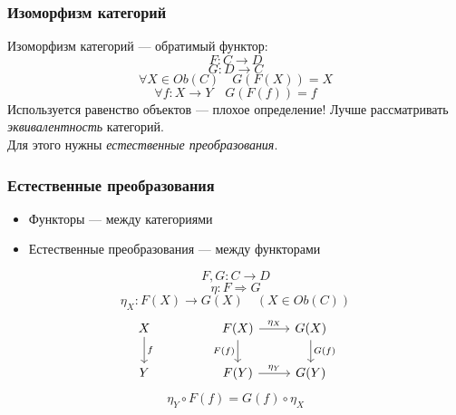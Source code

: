 \documentclass{beamer}
\begin{document}
\begin{frame}
\frametitle{Изоморфизм категорий}
Изоморфизм категорий --- обратимый функтор:
\begin{equation}F : C \rightarrow D\end{equation}
\begin{equation}G : D \rightarrow C\end{equation}
\begin{equation}\forall X \in Ob(C) \quad G(F(X)) = X\end{equation}
\begin{equation}\forall f:X\rightarrow Y \quad G(F(f)) = f\end{equation}
\pause
Используется равенство объектов --- плохое определение!
\pause
Лучше рассматривать \textit{эквивалентность} категорий. \\
Для этого нужны \textit{естественные преобразования}.
\end{frame}

\begin{frame}[fragile]
\frametitle{Естественные преобразования}
\begin{itemize}
\item Функторы --- между категориями
\pause
\item Естественные преобразования --- между функторами
\end{itemize}
\pause
\begin{equation}F, G: C \rightarrow D\end{equation}
\pause
\begin{equation}\eta: F \Rightarrow G\end{equation}
\begin{equation}\eta_X:F(X) \rightarrow G(X) \quad (X\in Ob(C))\end{equation}
\pause
\begin{equation}
\begin{tikzcd}
X \arrow{d}{f} && F(X) \arrow{d}[swap]{F(f)} \arrow{r}{\eta_X} & G(X) \arrow{d}{G(f)} \\
Y && F(Y) \arrow{r}{\eta_Y} & G(Y)
\end{tikzcd}
\end{equation}
\begin{equation}\eta_Y \circ F(f) = G(f) \circ \eta_X\end{equation}
\end{frame}
\end{document}
